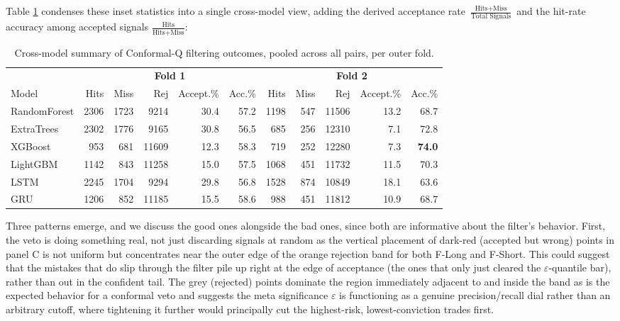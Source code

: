 \documentclass[12pt, a4paper]{article}
\begin{document}
Table \ref{tab:conformal_tournament_summary} condenses these inset statistics into a single cross-model view, adding the derived acceptance rate 
$\frac{\text{Hits}+\text{Miss}}{\text{Total Signals}}$ and the hit-rate accuracy among accepted signals $\frac{\text{Hits}}{\text{Hits}+\text{Miss}}$:

\begin{table}[H]
\centering
\small
\begin{tabular}{l|rrr|r|r||rrr|r|r}
\toprule
 & \multicolumn{5}{c||}{\textbf{Fold 1}} & \multicolumn{5}{c}{\textbf{Fold 2}} \\
Model & Hits & Miss & Rej & Accept.\% & Acc.\% & Hits & Miss & Rej & Accept.\% & Acc.\% \\
\midrule
RandomForest & 2306 & 1723 & 9214  & 30.4 & 57.2 & 1198 & 547 & 11506 & 13.2 & 68.7 \\
ExtraTrees   & 2302 & 1776 & 9165  & 30.8 & 56.5 & 685  & 256 & 12310 & 7.1  & 72.8 \\
XGBoost      & 953  & 681  & 11609 & 12.3 & 58.3 & 719  & 252 & 12280 & 7.3  & \textbf{74.0} \\
LightGBM     & 1142 & 843  & 11258 & 15.0 & 57.5 & 1068 & 451 & 11732 & 11.5 & 70.3 \\
LSTM         & 2245 & 1704 & 9294  & 29.8 & 56.8 & 1528 & 874 & 10849 & 18.1 & 63.6 \\
GRU          & 1206 & 852  & 11185 & 15.5 & 58.6 & 988  & 451 & 11812 & 10.9 & 68.7 \\
\bottomrule
\end{tabular}
\caption{Cross-model summary of Conformal-Q filtering outcomes, pooled across all pairs, per outer fold.}
\label{tab:conformal_tournament_summary}
\end{table}

Three patterns emerge, and we discuss the good ones alongside the bad ones, since both are informative about the filter's behavior.
First, the veto is doing something real, not just discarding signals at random as the vertical placement of dark-red (accepted but wrong) points in panel C is not uniform but 
concentrates near the outer edge of the orange rejection band for both F-Long and F-Short. This could suggest that the mistakes that do slip through the filter 
pile up right at the edge of acceptance (the ones that only just cleared the $\varepsilon$-quantile bar), rather than out in the confident tail.
The grey (rejected) points dominate the region immediately adjacent to and inside the band as is the 
expected behavior for a conformal veto and suggests the meta significance $\varepsilon$ is functioning as a genuine precision/recall dial rather than an arbitrary cutoff, where 
tightening it further would principally cut the highest-risk, lowest-conviction trades first.
\end{document}
